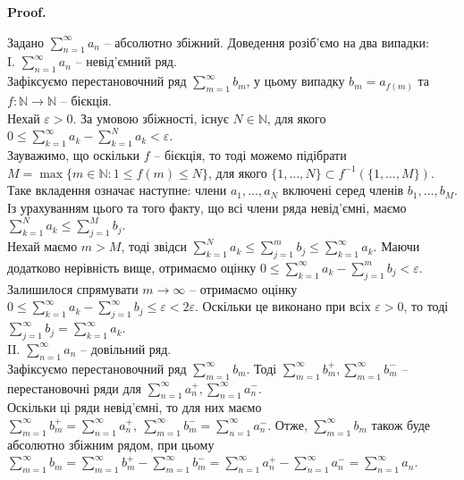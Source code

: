 \documentclass[a4paper, 10pt]{article}
\makeatletter
\def\qed{$\blacksquare$}
\theoremstyle{theoremdd}
\theoremstyle{theoremdd}
\theoremstyle{theoremdd}
\theoremstyle{theoremdd}
\theoremstyle{theoremdd}
\theoremstyle{theoremdd}
\theoremstyle{theoremdd}
\theoremstyle{theoremdd}
\theoremstyle{theoremdd}
\renewenvironment{proof}[1][Proof.\\]{\par
\pushQED{\hfill \qed}%
\normalfont \topsep6\p@\@plus6\p@\relax
\trivlist
\item\relax
{\bfseries
#1\@addpunct{.}}\hspace\labelsep\ignorespaces
}{%
\popQED\endtrivlist\@endpefalse
}
\makeatother
\begin{document}
\begin{proof}
Задано $\displaystyle \sum_{n=1}^\infty a_n$ -- абсолютно збіжний. Доведення розіб'ємо на два випадки:\\
I. $\displaystyle\sum_{n=1}^\infty a_n$ -- невід'ємний ряд.\\
Зафіксуємо перестановочний ряд $\displaystyle\sum_{m=1}^\infty b_m$, у цьому випадку $b_m = a_{f(m)}$ та $f \colon \mathbb{N} \to \mathbb{N}$ -- бієкція.\\
Нехай $\varepsilon > 0$. За умовою збіжності, існує $N \in \mathbb{N}$, для якого $0 \leq \displaystyle\sum_{k=1}^\infty a_k - \sum_{k=1}^N a_k < \varepsilon$.\\
Зауважимо, що оскільки $f$ -- бієкція, то тоді можемо підібрати $M = \max\{m \in \mathbb{N} : 1 \leq f(m) \leq N\}$, для якого $\{1,\dots,N\} \subset f^{-1}(\{1,\dots,M\})$. Таке вкладення означає наступне: члени $a_1,\dots,a_N$ включені серед членів $b_1,\dots,b_M$. Із урахуванням цього та того факту, що всі члени ряда невід'ємні, маємо $\displaystyle\sum_{k=1}^N a_k \leq \sum_{j=1}^M b_j$. \\
Нехай маємо $m > M$, тоді звідси $\displaystyle\sum_{k=1}^N a_k \leq \sum_{j=1}^m b_j \leq \sum_{k=1}^\infty a_k$. Маючи додатково нерівність вище, отримаємо оцінку $0 \leq \displaystyle\sum_{k=1}^\infty a_k - \sum_{j=1}^m b_j < \varepsilon$. Залишилося спрямувати $m \to \infty$ -- отримаємо оцінку $\displaystyle 0 \leq \sum_{k=1}^\infty a_k - \sum_{j=1}^\infty b_j \leq \varepsilon < 2 \varepsilon$. Оскільки це виконано при всіх $\varepsilon > 0$, то тоді $\displaystyle\sum_{j=1}^\infty b_j = \sum_{k=1}^\infty a_k$.
\bigskip \\
II. $\displaystyle\sum_{n=1}^\infty a_n$ -- довільний ряд.\\
Зафіксуємо перестановочний ряд $\displaystyle\sum_{m=1}^\infty b_m$. Тоді $\displaystyle\sum_{m=1}^\infty b_m^+, \sum_{m=1}^\infty b_m^-$ -- перестановочні ряди для $\displaystyle\sum_{n=1}^\infty a_n^+,\sum_{n=1}^\infty a_n^-$.\\
Оскільки ці ряди невід'ємні, то для них маємо $\displaystyle\sum_{m=1}^\infty b_m^+ = \sum_{n=1}^\infty a_n^+,\ \sum_{m=1}^\infty b_m^- = \sum_{n=1}^\infty a_n^-$. Отже, $\displaystyle\sum_{m=1}^\infty b_m$ також буде абсолютно збіжним рядом, при цьому\\
$\displaystyle\sum_{m=1}^\infty b_m = \sum_{m=1}^\infty b_m^+ - \sum_{m=1}^\infty b_m^- = \sum_{n=1}^\infty a_n^+ - \sum_{n=1}^\infty a_n^- = \sum_{n=1}^\infty a_n$.
\end{proof}
\end{document}
